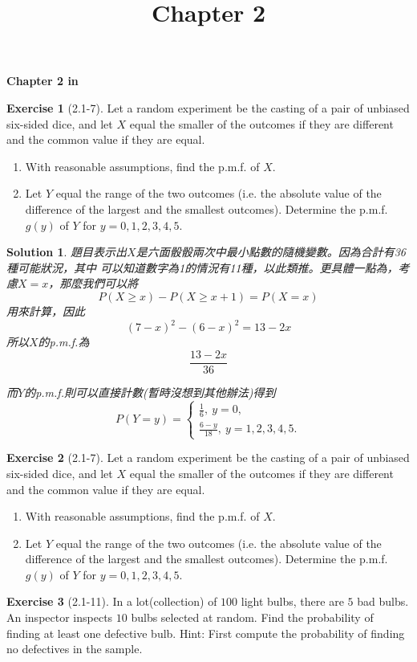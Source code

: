 \documentclass[14pt]{article}
\newtheorem*{solution}{Solution}
\theoremstyle{definition}
\newtheorem*{exercise}{Exercise}
\theoremstyle{remark}
\numberwithin{equation}{section}
\numberwithin{theorem}{section}
\begin{document}
\setcounter{section}{0}
\title{Chapter 2}

\thispagestyle{empty}
\begin{center}
{\LARGE \bf Chapter 2 in \cite{Hog10}}
\end{center}

\begin{exercise}[2.1-7]
    Let a random experiment be the casting of a pair of unbiased six-sided dice, 
    and let $X$ equal the smaller of the outcomes if they are different and the common 
    value if they are equal.
    \begin{enumerate}
    \item With reasonable assumptions, find the p.m.f. of $X$.
    \item Let $Y$ equal the range of the two outcomes (i.e. the absolute value of the difference
     of the largest and the smallest outcomes). Determine the p.m.f. $g(y)$ of $Y$ for $y=0, 1, 2, 3, 4, 5$.
    \end{enumerate}
\end{exercise}

\begin{solution}
題目表示出$X$是六面骰骰兩次中最小點數的隨機變數。因為合計有36種可能狀況，其中
可以知道數字為1的情況有11種，以此類推。更具體一點為，考慮$X=x$，那麼我們可以將 
\[
P(X\geq x)-P(X\geq x+1)=P(X=x)
\]
用來計算，因此
\[
(7-x)^2-(6-x)^2=13-2x
\]
所以$X$的p.m.f.為
\[
\frac{13-2x}{36}
\]

而$Y$的p.m.f.則可以直接計數(暫時沒想到其他辦法)得到
\[P(Y=y)=\begin{cases}
\frac{1}{6},\ y=0,\\
\frac{6-y}{18},\ y=1,2,3,4,5.
\end{cases}\]

\end{solution}

\begin{exercise}[2.1-7]
    Let a random experiment be the casting of a pair of unbiased six-sided dice, 
    and let $X$ equal the smaller of the outcomes if they are different and the common 
    value if they are equal.
    \begin{enumerate}
    \item With reasonable assumptions, find the p.m.f. of $X$.
    \item Let $Y$ equal the range of the two outcomes (i.e. the absolute value of the difference
     of the largest and the smallest outcomes). Determine the p.m.f. $g(y)$ of $Y$ for $y=0, 1, 2, 3, 4, 5$.
    \end{enumerate}
\end{exercise}

\begin{exercise}[2.1-11]
    In a lot(collection) of $100$ light bulbs, there are $5$ bad bulbs. An inspector
    inspects $10$ bulbs selected at random. Find the probability of finding at least 
    one defective bulb. Hint: First compute the probability of finding no defectives in 
    the sample.
\end{exercise}


\newpage


\nocite{*}
\end{document}
